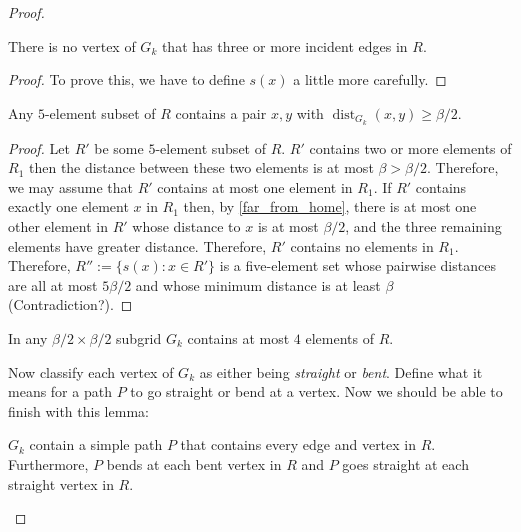 \documentclass{patmorin}
\DeclareMathOperator{\dist}{dist}
\begin{document}
\begin{proof}
  \begin{clm}
      There is no vertex of $G_k$ that has three or more incident edges in $R$.
  \end{clm}

  \begin{proof}
    To prove this, we have to define $s(x)$ a little more carefully.
  \end{proof}

  \begin{clm}
    Any $5$-element subset of $R$ contains a pair $x,y$ with $\dist_{G_k}(x,y)\ge\beta/2$.
  \end{clm}

  \begin{proof}
    Let $R'$ be some $5$-element subset of $R$. $R'$ contains two or more elements of $R_1$ then the distance between these two elements is at most $\beta>\beta/2$.  Therefore, we may assume that $R'$ contains at most one element in $R_1$.  If $R'$ contains exactly one element $x$ in $R_1$ then, by \cref{far_from_home}, there is at most one other element in $R'$ whose distance to $x$ is at most $\beta/2$, and the three remaining elements have greater distance.  Therefore, $R'$ contains no elements in $R_1$.  Therefore, $R'':=\{s(x):x\in R'\}$ is a five-element set whose pairwise distances are all at most $5\beta/2$ and whose minimum distance is at least $\beta$ (Contradiction?).
  \end{proof}

  \begin{cor}
      In any $\beta/2\times \beta/2$ subgrid $G_k$ contains at most $4$ elements of $R$.
  \end{cor}

    Now classify each vertex of $G_k$ as either being \emph{straight} or \emph{bent}. Define what it means for a path $P$ to go straight or bend at a vertex.  Now we should be able to finish with this lemma:

    \begin{lem}
        $G_k$ contain a simple path $P$ that contains every edge and vertex in $R$.  Furthermore, $P$ bends at each bent vertex in $R$ and $P$ goes straight at each straight vertex in $R$.
    \end{lem}
\end{proof}









\end{document}
